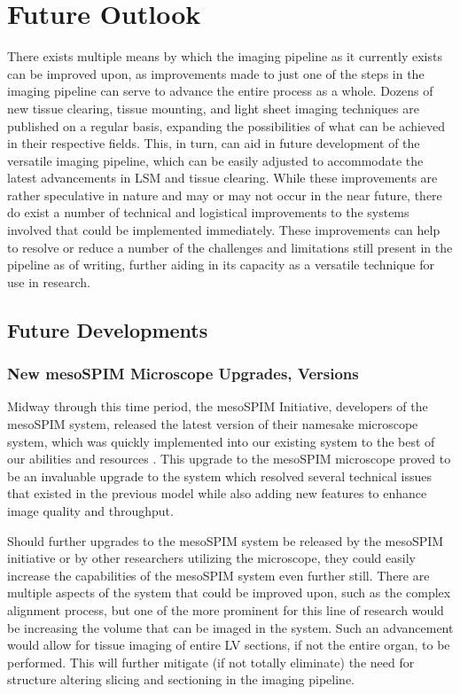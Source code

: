 \newpage
\section{Future Outlook}
There exists multiple means by which the imaging pipeline as it currently exists can be improved upon, as improvements made to just one of the steps in the imaging pipeline can serve to advance the entire process as a whole. Dozens of new tissue clearing, tissue mounting, and light sheet imaging techniques are published on a regular basis, expanding the possibilities of what can be achieved in their respective fields. This, in turn, can aid in future development of the versatile imaging pipeline, which can be easily adjusted to accommodate the latest advancements in LSM and tissue clearing. While these improvements are rather speculative in nature and may or may not occur in the near future, there do exist a number of technical and logistical improvements to the systems involved that could be implemented immediately. These improvements can help to resolve or reduce a number of the challenges and limitations still present in the pipeline as of writing, further aiding in its capacity as a versatile technique for use in research.

\subsection{Future Developments}
\subsubsection{New mesoSPIM Microscope Upgrades, Versions}
Midway through this time period, the mesoSPIM Initiative, developers of the mesoSPIM system, released the latest version of their namesake microscope system, which was quickly implemented into our existing system to the best of our abilities and resources \cite{vladimirov_benchtop_2024}. This upgrade to the mesoSPIM microscope proved to be an invaluable upgrade to the system which resolved several technical issues that existed in the previous model while also adding new features to enhance image quality and throughput. 

Should further upgrades to the mesoSPIM system be released by the mesoSPIM initiative or by other researchers utilizing the microscope, they could easily increase the capabilities of the mesoSPIM system even further still. There are multiple aspects of the system that could be improved upon, such as the complex alignment process, but one of the more prominent for this line of research would be increasing the volume that can be imaged in the system. Such an advancement would allow for tissue imaging of entire LV sections, if not the entire organ, to be performed. This will further mitigate (if not totally eliminate) the need for structure altering slicing and sectioning in the imaging pipeline.

